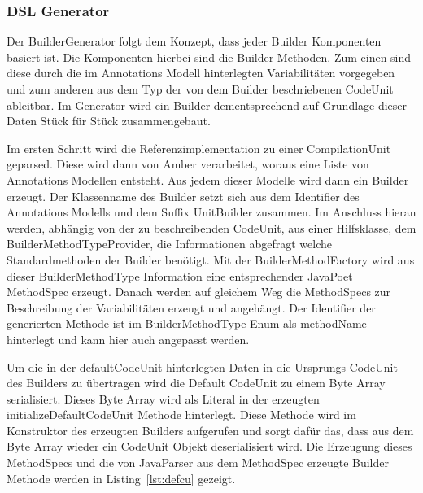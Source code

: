 \documentclass[12pt,oneside,a4paper,parskip]{scrbook}
\begin{document}
\subsubsection{DSL Generator}\label{sec:dslgen}

Der BuilderGenerator folgt dem Konzept, dass jeder Builder Komponenten basiert ist. Die Komponenten hierbei sind die Builder Methoden. Zum einen sind diese durch die im Annotations Modell hinterlegten Variabilitäten vorgegeben und zum anderen aus dem Typ der von dem Builder beschriebenen CodeUnit ableitbar. Im Generator wird ein Builder dementsprechend auf Grundlage dieser Daten Stück für Stück zusammengebaut.

Im ersten Schritt wird die Referenzimplementation zu einer CompilationUnit geparsed. Diese wird dann von Amber verarbeitet, woraus eine Liste von Annotations Modellen entsteht. Aus jedem dieser Modelle wird dann ein Builder erzeugt. Der Klassenname des Builder setzt sich aus dem Identifier des Annotations Modells und dem Suffix UnitBuilder zusammen. Im Anschluss hieran werden, abhängig von der zu beschreibenden CodeUnit, aus einer Hilfsklasse, dem BuilderMethodTypeProvider, die Informationen abgefragt welche Standardmethoden der Builder benötigt. Mit der BuilderMethodFactory wird aus dieser BuilderMethodType Information eine entsprechender JavaPoet MethodSpec erzeugt. Danach werden auf gleichem Weg die MethodSpecs zur Beschreibung der Variabilitäten erzeugt und angehängt. Der Identifier der generierten Methode ist im BuilderMethodType Enum als methodName hinterlegt und kann hier auch angepasst werden.

Um die in der defaultCodeUnit hinterlegten Daten in die Ursprungs-CodeUnit des Builders zu übertragen wird die Default CodeUnit zu einem Byte Array serialisiert. Dieses Byte Array wird als Literal in der erzeugten initializeDefaultCodeUnit Methode hinterlegt. Diese Methode wird im Konstruktor des erzeugten Builders aufgerufen und sorgt dafür das, dass aus dem Byte Array wieder ein CodeUnit Objekt deserialisiert wird. Die Erzeugung dieses MethodSpecs und die von JavaParser aus dem MethodSpec erzeugte Builder Methode werden in Listing~\ref{lst:defcu} gezeigt.
\end{document}
